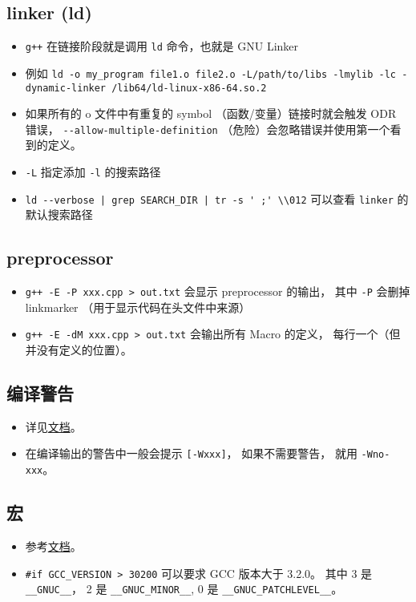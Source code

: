 \subsection{linker (ld)}
\begin{itemize}
\item \verb`g++` 在链接阶段就是调用 \verb`ld` 命令，也就是 GNU Linker
\item 例如 \verb`ld -o my_program file1.o file2.o -L/path/to/libs -lmylib -lc -dynamic-linker /lib64/ld-linux-x86-64.so.2`
\item 如果所有的 o 文件中有重复的 symbol （函数/变量）链接时就会触发 ODR 错误， \verb`--allow-multiple-definition` （危险）会忽略错误并使用第一个看到的定义。
\item \verb`-L` 指定添加 \verb`-l` 的搜索路径
\item \verb`ld --verbose | grep SEARCH_DIR | tr -s ' ;' \\012` 可以查看 \verb`linker` 的默认搜索路径
\end{itemize}

\subsection{preprocessor}
\begin{itemize}
\item \verb`g++ -E -P xxx.cpp > out.txt` 会显示 preprocessor 的输出， 其中 \verb`-P` 会删掉 linkmarker （用于显示代码在头文件中来源）
\item \verb`g++ -E -dM xxx.cpp > out.txt` 会输出所有 Macro 的定义， 每行一个（但并没有定义的位置）。
\end{itemize}

\subsection{编译警告}
\begin{itemize}
\item 详见\href{https://gcc.gnu.org/onlinedocs/gcc/Warning-Options.html}{文档}。
\item 在编译输出的警告中一般会提示 \verb`[-Wxxx]`， 如果不需要警告， 就用 \verb`-Wno-xxx`。
\end{itemize}

\subsection{宏}
\begin{itemize}
\item 参考\href{https://gcc.gnu.org/onlinedocs/cpp/Common-Predefined-Macros.html}{文档}。
\item \verb`#if GCC_VERSION > 30200` 可以要求 GCC 版本大于 3.2.0。 其中 3 是 \verb`__GNUC__`， 2 是 \verb`__GNUC_MINOR__`,  0 是 \verb`__GNUC_PATCHLEVEL__`。
\end{itemize}

